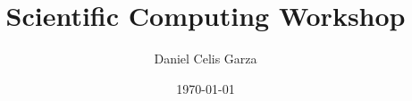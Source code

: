 \documentclass[10pt,a4paper]{article}
\title{Scientific Computing Workshop}
\author{Daniel Celis Garza}
\date{\today}
\begin{document}
    \maketitle
    \cite{knuthwebsite}
    
    
\end{document}
